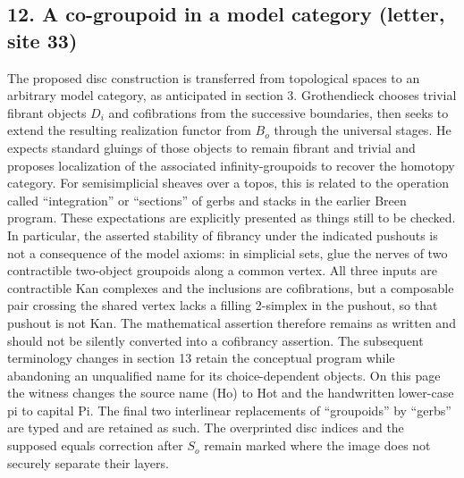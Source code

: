\documentclass[10pt,oneside]{book}
\begin{document}
\subsection*{12. A co-groupoid in a model category (letter, site 33)}
The proposed disc construction is transferred from topological spaces to an arbitrary model category, as anticipated in section 3. Grothendieck chooses trivial fibrant objects $D_i$ and cofibrations from the successive boundaries, then seeks to extend the resulting realization functor from $B_o$ through the universal stages. He expects standard gluings of those objects to remain fibrant and trivial and proposes localization of the associated infinity-groupoids to recover the homotopy category. For semisimplicial sheaves over a topos, this is related to the operation called ``integration'' or ``sections'' of gerbs and stacks in the earlier Breen program. These expectations are explicitly presented as things still to be checked. In particular, the asserted stability of fibrancy under the indicated pushouts is not a consequence of the model axioms: in simplicial sets, glue the nerves of two contractible two-object groupoids along a common vertex. All three inputs are contractible Kan complexes and the inclusions are cofibrations, but a composable pair crossing the shared vertex lacks a filling 2-simplex in the pushout, so that pushout is not Kan. The mathematical assertion therefore remains as written and should not be silently converted into a cofibrancy assertion. The subsequent terminology changes in section 13 retain the conceptual program while abandoning an unqualified name for its choice-dependent objects. On this page the witness changes the source name (Ho) to Hot and the handwritten lower-case pi to capital Pi. The final two interlinear replacements of ``groupoids'' by ``gerbs'' are typed and are retained as such. The overprinted disc indices and the supposed equals correction after $S_o$ remain marked where the image does not securely separate their layers.
\end{document}
